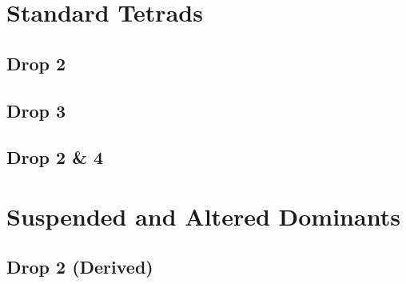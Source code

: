 \documentclass[a4paper, 10pt]{article}
\begin{document}



\clearpage
\pagestyle{plain}
\tableofcontents
\clearpage

\pagestyle{fancy}

\section{Standard Tetrads}

\subsection{Drop 2}

\clearpage

\subsection{Drop 3}

\clearpage

\subsection{Drop 2 \& 4}

\clearpage


\section{Suspended and Altered Dominants}

\subsection{Drop 2 (Derived)}

\end{document}
